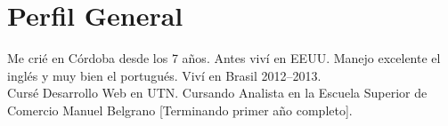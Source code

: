 \documentclass[a4paper, hidelinks]{twentysecondcv}
\begin{document}
\makeprofile %

\vfill 



\section{Perfil General} %

Me crié en Córdoba desde los 7 años. Antes viví en EEUU. 
Manejo excelente el inglés y muy bien el portugués. Viví en Brasil 2012–2013.\\
Cursé Desarrollo Web en UTN.
Cursando Analista en la Escuela Superior de Comercio Manuel Belgrano [Terminando primer año completo].


\end{document}
